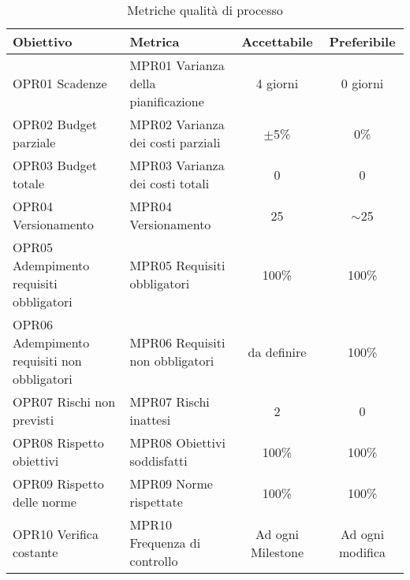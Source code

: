 \documentclass[../piano_di_qualifica.tex]{subfiles}
\begin{document}
\begin{table}[!ht]
	\centering
	\begin{tabular}{|p{5.5cm}|p{4.5cm}|c|c|}
		\hline
		\rowcolor{lightgray}
		\textbf{Obiettivo}                          & \textbf{Metrica}                    & \textbf{Accettabile} & \textbf{Preferibile} \\
		\hline
		OPR01 Scadenze                              & MPR01 Varianza della pianificazione & 4 giorni             & 0 giorni             \\
		OPR02 Budget parziale                       & MPR02 Varianza dei costi parziali   & $\pm$5\%             & 0\%                  \\
		OPR03 Budget totale							& MPR03 Varianza dei costi totali	  & 0					& 0						\\
		OPR04 Versionamento							& MPR04 Versionamento				&	25					& $\sim$25				\\
		OPR05 Adempimento requisiti obbligatori     & MPR05 Requisiti obbligatori         & 100\%                & 100\%                \\
		OPR06 Adempimento requisiti non obbligatori & MPR06 Requisiti non obbligatori     & da definire          & 100\%                \\
		OPR07 Rischi non previsti 					& MPR07 Rischi inattesi					& 2					& 0						\\
		OPR08 Rispetto obiettivi                    & MPR08 Obiettivi soddisfatti         & 100\%                & 100\%                \\
		OPR09 Rispetto delle norme                  & MPR09 Norme rispettate              & 100\%                & 100\%                \\
		OPR10 Verifica costante                     & MPR10 Frequenza di controllo        & Ad ogni Milestone    & Ad ogni modifica     \\
		\hline
	\end{tabular}
	\caption{Metriche qualità di processo}
\end{table}

\clearpage
\end{document}
